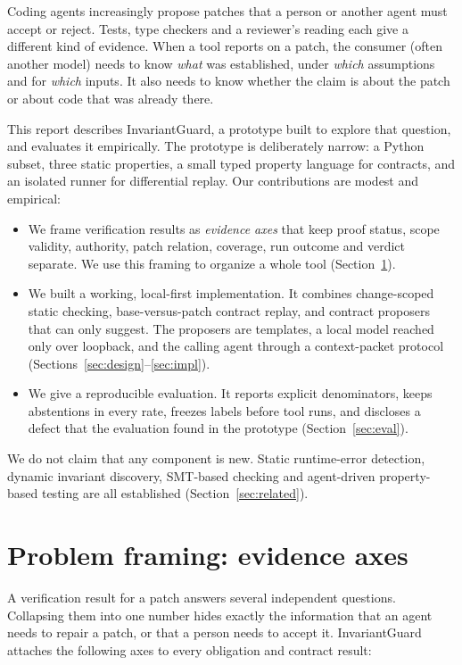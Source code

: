 \documentclass[10pt,twocolumn]{article}
\begin{document}
Coding agents increasingly propose patches that a person or another agent must accept or reject. Tests, type checkers
and a reviewer's reading each give a different kind of evidence. When a tool reports on a patch, the consumer (often
another model) needs to know \emph{what} was established, under \emph{which} assumptions and for \emph{which} inputs.
It also needs to know whether the claim is about the patch or about code that was already there.

This report describes InvariantGuard, a prototype built to explore that question, and evaluates it empirically. The
prototype is deliberately narrow: a Python subset, three static properties, a small typed property language for
contracts, and an isolated runner for differential replay. Our contributions are modest and empirical:
\begin{itemize}
\item We frame verification results as \emph{evidence axes} that keep proof status, scope validity, authority, patch
  relation, coverage, run outcome and verdict separate. We use this framing to organize a whole tool
  (Section~\ref{sec:framing}).
\item We built a working, local-first implementation. It combines change-scoped static checking, base-versus-patch
  contract replay, and contract proposers that can only suggest. The proposers are templates, a local model reached only
  over loopback, and the calling agent through a context-packet protocol
  (Sections~\ref{sec:design}--\ref{sec:impl}).
\item We give a reproducible evaluation. It reports explicit denominators, keeps abstentions in every rate, freezes
  labels before tool runs, and discloses a defect that the evaluation found in the prototype (Section~\ref{sec:eval}).
\end{itemize}
We do not claim that any component is new. Static runtime-error detection, dynamic invariant discovery, SMT-based
checking and agent-driven property-based testing are all established (Section~\ref{sec:related}).

\section{Problem framing: evidence axes}
\label{sec:framing}

A verification result for a patch answers several independent questions. Collapsing them into one number hides exactly
the information that an agent needs to repair a patch, or that a person needs to accept it. InvariantGuard attaches
the following axes to every obligation and contract result:
\end{document}
